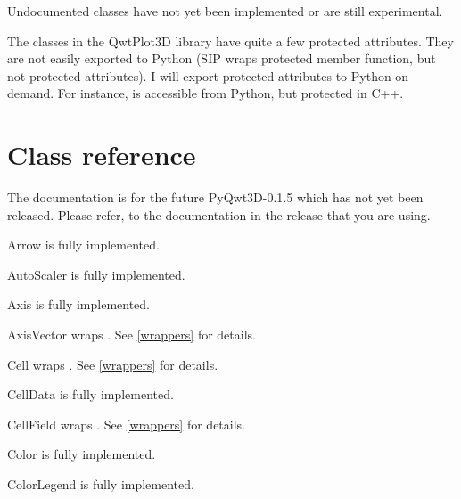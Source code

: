 \documentclass{manual}
\newcommand{\Future}{
  \begin{notice}[warning]
    The documentation is for the future PyQwt3D-0.1.5 which has not yet been
    released.  Please refer, to the documentation in the release that you are
    using.
  \end{notice}
}
\begin{document}
Undocumented classes have not yet been implemented or are still experimental.

The classes in the QwtPlot3D library have quite a few protected attributes.
They are not easily exported to Python (SIP wraps protected member function,
but not protected attributes).
I will export protected attributes to Python on demand. For instance,
 is accessible from Python, but protected in C++.


\section{Class reference \label{classes}}

\Future{}

\begin{classdesc*}{Arrow}
  is fully implemented.
\end{classdesc*}

\begin{classdesc*}{AutoScaler}
  is fully implemented.
\end{classdesc*}

\begin{classdesc*}{Axis}
  is fully implemented.
\end{classdesc*}

\begin{classdesc*}{AxisVector}
  wraps . See \ref{wrappers} for details.
\end{classdesc*}

\begin{classdesc*}{Cell}
  wraps . See \ref{wrappers} for details.
\end{classdesc*}

\begin{classdesc*}{CellData}
  is fully implemented.
\end{classdesc*}

\begin{classdesc*}{CellField}
  wraps . See \ref{wrappers} for details.
\end{classdesc*}

\begin{classdesc*}{Color}
  is fully implemented.
\end{classdesc*}

\begin{classdesc*}{ColorLegend}
  is fully implemented.
\end{classdesc*}
\end{document}

